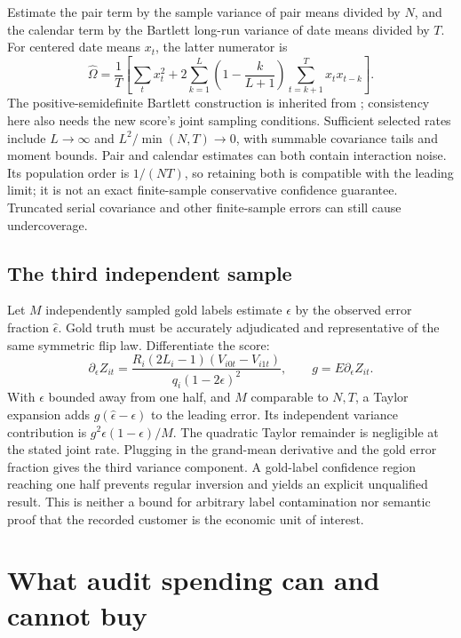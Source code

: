 Estimate the pair term by the sample variance of pair means divided by $N$,
and the calendar term by the Bartlett long-run variance of date means divided
by $T$. For centered date means $x_t$, the latter numerator is
\[
 \widehat\Omega=\frac1T\left[\sum_t x_t^2+
 2\sum_{k=1}^{L}\left(1-\frac{k}{L+1}\right)
       \sum_{t=k+1}^{T}x_tx_{t-k}\right].
\]
The positive-semidefinite Bartlett construction is inherited from
\citet{newey1986}; consistency here also needs the new score's joint sampling
conditions. Sufficient selected rates include $L\to\infty$ and
$L^2/\min(N,T)\to0$, with summable covariance tails and moment bounds.
Pair and calendar estimates can both contain interaction noise. Its population
order is $1/(NT)$, so retaining both is compatible with the leading limit;
it is not an exact finite-sample conservative confidence guarantee. Truncated
serial covariance and other finite-sample errors can still cause undercoverage.

\subsection{The third independent sample}

Let $M$ independently sampled gold labels estimate $\epsilon$ by the observed
error fraction $\hat\epsilon$. Gold truth must be accurately adjudicated and
representative of the same symmetric flip law. Differentiate the score:
\[
 \partial_\epsilon Z_{it}
   =\frac{R_i(2L_i-1)(V_{i0t}-V_{i1t})}
          {q_i(1-2\epsilon)^2},\qquad
 g=E\partial_\epsilon Z_{it}.
\]
With $\epsilon$ bounded away from one half, and $M$ comparable to $N,T$, a
Taylor expansion adds $g(\hat\epsilon-\epsilon)$ to the leading error. Its
independent variance contribution is $g^2\epsilon(1-\epsilon)/M$.
The quadratic Taylor remainder is negligible at the stated joint rate.
Plugging in the grand-mean derivative and the gold error fraction gives the
third variance component. A gold-label confidence region reaching one half
prevents regular inversion and yields an explicit unqualified result. This
is neither a bound for arbitrary label contamination nor semantic proof that
the recorded customer is the economic unit of interest.

\section{What audit spending can and cannot buy}
\label{r8:audit-design}

